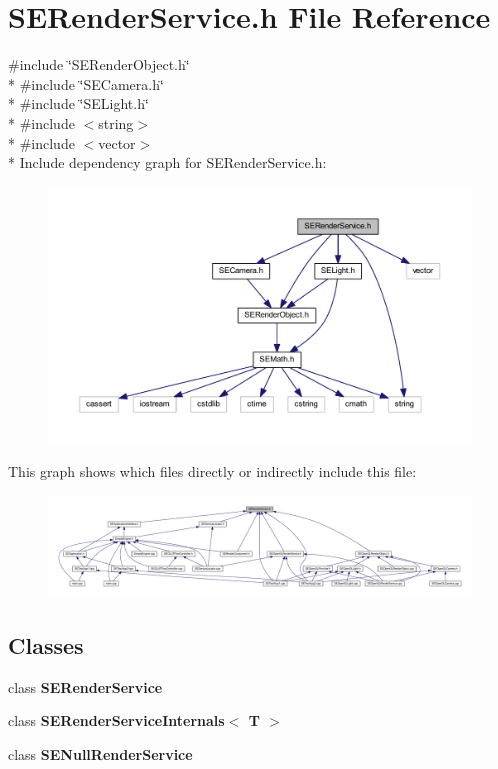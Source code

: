 \section{S\+E\+Render\+Service.\+h File Reference}
\label{_s_e_render_service_8h}
{\ttfamily \#include \char`\"{}S\+E\+Render\+Object.\+h\char`\"{}}\\*
{\ttfamily \#include \char`\"{}S\+E\+Camera.\+h\char`\"{}}\\*
{\ttfamily \#include \char`\"{}S\+E\+Light.\+h\char`\"{}}\\*
{\ttfamily \#include $<$string$>$}\\*
{\ttfamily \#include $<$vector$>$}\\*
Include dependency graph for S\+E\+Render\+Service.\+h\+:
\nopagebreak
\begin{figure}[H]
\begin{center}
\leavevmode
\includegraphics[width=350pt]{_s_e_render_service_8h__incl}
\end{center}
\end{figure}
This graph shows which files directly or indirectly include this file\+:
\nopagebreak
\begin{figure}[H]
\begin{center}
\leavevmode
\includegraphics[width=350pt]{_s_e_render_service_8h__dep__incl}
\end{center}
\end{figure}
\subsection*{Classes}
\begin{DoxyCompactItemize}
\item 
class {\bf S\+E\+Render\+Service}
\item 
class {\bf S\+E\+Render\+Service\+Internals$<$ T $>$}
\item 
class {\bf S\+E\+Null\+Render\+Service}
\end{DoxyCompactItemize}
